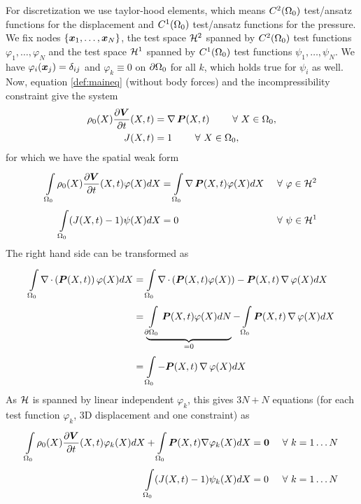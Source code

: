 For discretization we use taylor-hood elements, which means $C^2(\Omega_0)$ test/ansatz functions for the displacement and $C^1(\Omega_0)$ test/ansatz functions for
the pressure.
We fix nodes $\{\boldsymbol{x}_1,\ldots,\boldsymbol{x}_N\}$, the test space $\mathcal{H}^2$ spanned by $C^2(\Omega_0)$ test functions
$\varphi_1,\ldots,\varphi_N$ and the test space $\mathcal{H}^1$ spanned by $C^1(\Omega_0)$ test functions
$\psi_1,\ldots,\psi_N$. 
We have $\varphi_i(\boldsymbol{x}_j) = \delta_{ij}$ and $\varphi_k \equiv 0$ on $\partial\Omega_0$ for all $k$, which holds true for $\psi_i$ as well.
Now, equation \eqref{def:maineq} (without body forces) and the incompressibility constraint give the system 
\begin{align}
	\rho_0(X)\frac{\partial \boldsymbol{V}}{\partial t}(X,t) &= \operatorname{\nabla}\boldsymbol{P}(X,t) \qquad ~\forall~ X\in\Omega_0,\\
	J(X,t) &= 1 \qquad ~\forall~ X\in\Omega_0,
\end{align}
for which we have the spatial weak form
\begin{align}
	\int\limits_{\Omega_0}^{}\rho_0(X)\frac{\partial \boldsymbol{V}}{\partial t}(X,t)\varphi(X)dX &= \int\limits_{\Omega_0}^{}\operatorname{\nabla}\boldsymbol{P}(X,t)\varphi(X)dX &&~\forall~ \varphi\in\mathcal{H}^2\\
	\int\limits_{\Omega_0}^{} (J(X,t)-1)\psi(X)dX &= 0 && ~\forall~ \psi\in\mathcal{H}^1
\end{align}
The right hand side can be transformed as
\begin{align*}
	\int\limits_{\Omega_0}^{} \operatorname{\nabla}\cdot\left(\boldsymbol{P}(X,t)\right)\varphi(X) dX &= \int\limits_{\Omega_0}^{} \operatorname{\nabla}\cdot\left(\boldsymbol{P}(X,t)\varphi(X)\right) - \boldsymbol{P}(X,t)\operatorname{\nabla}\varphi(X) dX\\
		 &= \underbrace{\int\limits_{\partial\Omega_0}^{} \boldsymbol{P}(X,t)\varphi(X) dN}_{=0} - \int\limits_{\Omega_0}^{} \boldsymbol{P}(X,t)\operatorname{\nabla}\varphi(X)dX\\
		 &= \int\limits_{\Omega_0}^{} -\boldsymbol{P}(X,t)\operatorname{\nabla}\varphi(X) dX
\end{align*}
As $\mathcal{H}$ is spanned by linear independent $\varphi_k$,
this gives $3N+N$ equations (for each test function $\varphi_k$, 3D displacement and one constraint) as
\begin{align}
	\int\limits_{\Omega_0}^{} \rho_0(X)\frac{\partial \boldsymbol{V}}{\partial t}(X,t)\varphi_k(X)dX + \int\limits_{\Omega_0}^{}\boldsymbol{P}(X,t)\nabla\varphi_{k}(X) dX &= \boldsymbol{0} && ~\forall~ k=1\ldots N\label{def:weakform}\\
	\int\limits_{\Omega_0}^{} (J(X,t)-1)\psi_k(X)dX &= 0 && ~\forall~ k=1\ldots N\label{def:weakform_nb}
\end{align}

